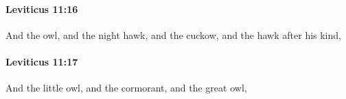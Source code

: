 		\paragraph{Leviticus 11:16} %
			\label{LEVITICUS-11-16}

			And the owl, and the night hawk, and the cuckow, and the hawk after his kind,


		\paragraph{Leviticus 11:17} %
			\label{LEVITICUS-11-17}

			And the little owl, and the cormorant, and the great owl,


